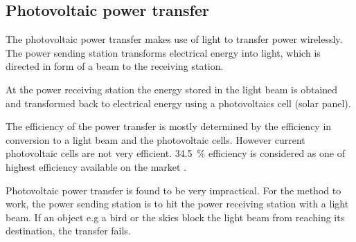 \subsection{Photovoltaic power transfer}\label{sec:PhotovoltaicPowerTransfer}
The photovoltaic power transfer makes use of light to transfer power wirelessly. The power sending station transforms electrical energy into light, which is directed in form of a beam to the receiving station.

At the power receiving station the energy stored in the light beam is obtained and transformed back to electrical energy using a photovoltaics cell (solar panel).

The efficiency of the power transfer is mostly determined by the efficiency in conversion to a light beam and the photovoltaic cells. However current photovoltaic cells are not very efficient. \SI{34.5}{\percent} efficiency is considered as one of highest efficiency available on the market \citep{News:most_efficient_solar_cells_ever}.%

Photovoltaic power transfer is found to be very impractical. For the method to work, the power sending station is to hit the power receiving station with a light beam. If an object e.g a bird or the skies block the light beam from reaching its destination, the transfer fails. 


